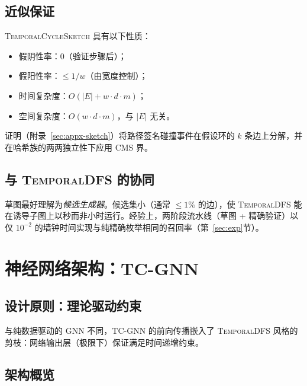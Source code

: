 \documentclass[journal,onecolumn]{IEEEtran}
\begin{document}
\subsection{近似保证}
\label{sec:approx-guarantee}

\begin{theorem}[草图保证]
\label{thm:sketch}
\textsc{TemporalCycleSketch} 具有以下性质：
\begin{itemize}
\item 假阴性率：$0$（验证步骤后）；
\item 假阳性率：$\leq 1/w$（由宽度控制）；
\item 时间复杂度：$O(|E| + w \cdot d \cdot m)$；
\item 空间复杂度：$O(w \cdot d \cdot m)$，与 $|E|$ 无关。
\end{itemize}
\end{theorem}
证明（附录~\ref{sec:appx-sketch}）将路径签名碰撞事件在假设环的 $k$ 条边上分解，并在哈希族的两两独立性下应用 CMS 界。

\subsection{与 \textsc{TemporalDFS} 的协同}
\label{sec:approx-synergy}

草图最好理解为\emph{候选生成器}。候选集小（通常 $\le 1\%$ 的边），使 \textsc{TemporalDFS} 能在诱导子图上以秒而非小时运行。经验上，两阶段流水线（草图 + 精确验证）以仅 $10^{-2}$ 的墙钟时间实现与纯精确枚举相同的召回率（第~\ref{sec:exp}节）。

\section{神经网络架构：\textsc{TC-GNN}}
\label{sec:model}

\subsection{设计原则：理论驱动约束}
\label{sec:model-principle}

与纯数据驱动的 GNN 不同，\textsc{TC-GNN} 的前向传播嵌入了 \textsc{TemporalDFS} 风格的剪枝：网络输出层（极限下）保证满足时间递增约束。

\subsection{架构概览}
\label{sec:model-arch}
\end{document}
